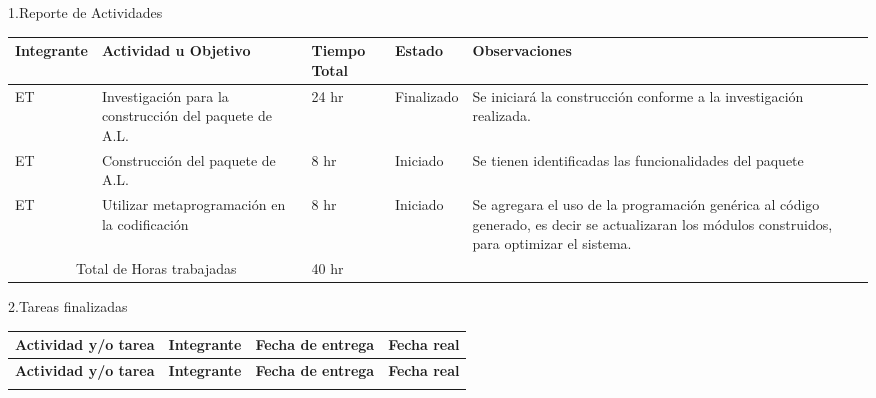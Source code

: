 \documentclass[12pt]{report}
\numberwithin{equation}{section}
\begin{document}
\begin{flushleft}

\large{1.Reporte de Actividades }\\


\begin{table}[H]
\begin{tabular}{|m{2cm}|m{4.5cm}|m{1.5cm}|m{1.5cm}|m{4.5cm}|}
\hline
\small{\textbf{Integrante}} &\small{ \textbf{Actividad u Objetivo}} &\small{ \textbf{Tiempo Total}} & \small{\textbf{Estado} }& \small{\textbf{Observaciones}}\\
\hline \hline
ET & Investigaci\'on para la construcci\'on del paquete de A.L.  & 24 hr & Finalizado & \small{Se iniciar\'a la construcci\'on conforme a la investigaci\'on realizada.}\\
\hline
ET & Construcci\'on del paquete de A.L.  & 8 hr & Iniciado & \small{Se tienen identificadas las funcionalidades del paquete}\\
\hline
ET & Utilizar metaprogramaci\'on en la codificaci\'on  & 8 hr & Iniciado & \small{Se agregara el uso de la programaci\'on genérica al código generado, es decir se actualizaran los módulos construidos, para optimizar el sistema.}\\
\hline
\multicolumn{2}{|c|}{Total de Horas trabajadas} & 40 hr  & & \\
\hline 
\end{tabular}
\label{tabla: TABLA CE Actividades}
\end{table}



\large{2.Tareas finalizadas }\\

\begin{longtable}[H]{|m{5cm}|m{3cm}|m{3cm}|m{3cm}|} 
\hline
\small{\textbf{Actividad y/o tarea }} &\small{ \textbf{Integrante}} & \small{\textbf{Fecha de entrega}} & \small{\textbf{Fecha real}}\\
\hline \hline
\endfirsthead

\hline
\small{\textbf{Actividad y/o tarea }} &\small{ \textbf{Integrante}} & \small{\textbf{Fecha de entrega}} & \small{\textbf{Fecha real}}\\
\hline \hline
\endhead
\hline
\endfoot


\end{longtable}
\end{flushleft}
\end{document}
